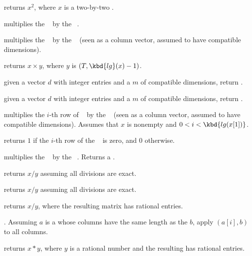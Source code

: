  returns $x^2$, where $x$ is a two-by-two .

 multiplies the ~
by the ~.

 multiplies the ~
by the ~ (seen as a column vector, assumed to have compatible
dimensions).

 returns $x \times y$, where $y$
is $(T, \kbd{lg}(x)-1)$.

 given a vector $d$ with integer entries
and a  $m$ of compatible dimensions, return .

 given a vector $d$ with integer entries
 and a  $m$ of compatible dimensions, return .




 multiplies the $i$-th row
of ~ by the ~ (seen as a column vector, assumed
to have compatible dimensions). Assumes that $x$ is nonempty and
$0 < i < \kbd{lg(x[1])}$.

 returns $1$ if the $i$-th row of
the ~ is zero, and $0$ otherwise.

 multiplies the ~
by the ~. Returns a .

 returns $x/y$ assuming all divisions
are exact.

 returns $x/y$ assuming all divisions
are exact.

 returns $x/y$, where the resulting matrix
has rational entries.

. Assuming $a$ is a 
whose columns have the same length as the  $b$, apply
$(a[i],b)$ to all columns.

 returns $x*y$, where $y$ is a rational number
and the resulting  has rational entries.

